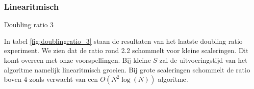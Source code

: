 \subsubsection{Linearitmisch}
\begin{table}[h]

\caption{Doubling ratio 3}
\label{fig:doublingratio_3}
\end{table}
In tabel \ref{fig:doublingratio_3} staan de resultaten van het laatste doubling ratio experiment.
We zien dat de ratio rond 2.2 schommelt voor kleine scaleringen.
Dit komt overeen met onze voorspellingen.
Bij kleine $S$ zal de uitvoeringstijd van het algoritme namelijk linearitmisch groeien.
Bij grote scaleringen schommelt de ratio boven $4$ zoals verwacht van een $O(N^2\log(N))$ algoritme.

